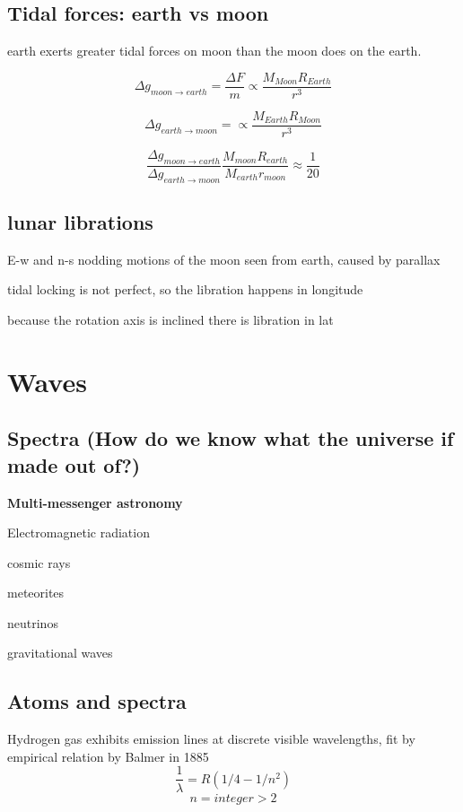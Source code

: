 \documentclass{article}
\begin{document}
\subsection{Tidal forces: earth vs moon}
\begin{list}{-}{}
\item earth exerts greater tidal forces on moon than the moon does on the earth.
\item \[\Delta g_{moon \rightarrow earth } = \frac{\Delta F}{m} \propto \frac{M_{Moon}{R_{Earth}}} {r^3}\]
\item \[\Delta g_{earth \rightarrow moon } = \propto \frac{M_{Earth}{R_{Moon}}} {r^3}\]
\item  \[\frac{\Delta g_{moon \rightarrow earth }}{\Delta g_{earth \rightarrow moon }} \frac{M_{moon}R_{earth}}{M_{earth} r_{moon}} \approx \frac{1}{20}\]
\end{list}

\subsection{lunar librations}
\begin{list}{-}{}
\item E-w and n-s nodding motions of the moon seen from earth, caused by parallax
\item tidal locking is not perfect, so the libration happens in longitude 
\item because the rotation axis is inclined there is libration in lat 
\end{list}

\section{Waves}
\subsection{Spectra (How do we know what the universe if made out of?)}
\noindent \textbf{\large Multi-messenger astronomy}
\begin{list}{-}{}
\item Electromagnetic radiation
\item cosmic rays
\item meteorites
\item neutrinos
\item gravitational waves
\end{list}

\subsection{Atoms and spectra}
Hydrogen gas exhibits emission lines at discrete visible wavelengths, fit by empirical relation by Balmer in 1885 
\[\frac{1}{\lambda} = R(1/4 -1/n^2)\]
\[n = integer > 2\]
\end{document}
